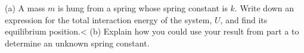         (a) A mass $m$ is hung from a spring whose spring constant is $k$. Write down
        an expression for the total interaction energy of the system, $U$, and find its equilibrium
        position.<%
        (b) Explain how you could use your result from part a to determine an unknown
        spring constant.
